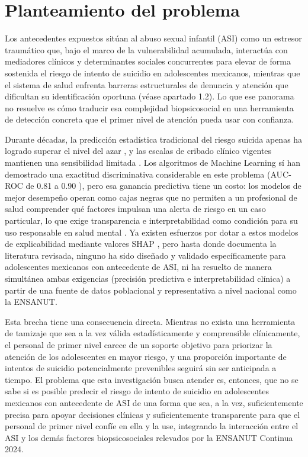 \section{Planteamiento del problema}

Los antecedentes expuestos sitúan al abuso sexual infantil (ASI) como un estresor traumático que, bajo el marco de la vulnerabilidad acumulada, interactúa con mediadores clínicos y determinantes sociales concurrentes para elevar de forma sostenida el riesgo de intento de suicidio en adolescentes mexicanos, mientras que el sistema de salud enfrenta barreras estructurales de denuncia y atención que dificultan su identificación oportuna (véase apartado 1.2). Lo que ese panorama no resuelve es cómo traducir esa complejidad biopsicosocial en una herramienta de detección concreta que el primer nivel de atención pueda usar con confianza.

Durante décadas, la predicción estadística tradicional del riesgo suicida apenas ha logrado superar el nivel del azar \cite{linthicumMachineLearningSuicide2019}, y las escalas de cribado clínico vigentes mantienen una sensibilidad limitada \cite{tangAnalysisEvaluationExplainable2024}. Los algoritmos de Machine Learning sí han demostrado una exactitud discriminativa considerable en este problema (AUC-ROC de 0.81 a 0.90 \cite{suMachineLearningSuicide2020,walshPredictingSuicideAttempts2018}), pero esa ganancia predictiva tiene un costo: los modelos de mejor desempeño operan como cajas negras que no permiten a un profesional de salud comprender qué factores impulsan una alerta de riesgo en un caso particular, lo que exige transparencia e interpretabilidad como condición para su uso responsable en salud mental \cite{joyceExplainableArtificialIntelligence2023,linthicumMachineLearningSuicide2019}. Ya existen esfuerzos por dotar a estos modelos de explicabilidad mediante valores SHAP \cite{nordinExplainableMachineLearning2022}, pero hasta donde documenta la literatura revisada, ninguno ha sido diseñado y validado específicamente para adolescentes mexicanos con antecedente de ASI, ni ha resuelto de manera simultánea ambas exigencias (precisión predictiva e interpretabilidad clínica) a partir de una fuente de datos poblacional y representativa a nivel nacional como la ENSANUT.

Esta brecha tiene una consecuencia directa. Mientras no exista una herramienta de tamizaje que sea a la vez válida estadísticamente y comprensible clínicamente, el personal de primer nivel carece de un soporte objetivo para priorizar la atención de los adolescentes en mayor riesgo, y una proporción importante de intentos de suicidio potencialmente prevenibles seguirá sin ser anticipada a tiempo. El problema que esta investigación busca atender es, entonces, que no se sabe si es posible predecir el riesgo de intento de suicidio en adolescentes mexicanos con antecedente de ASI de una forma que sea, a la vez, suficientemente precisa para apoyar decisiones clínicas y suficientemente transparente para que el personal de primer nivel confíe en ella y la use, integrando la interacción entre el ASI y los demás factores biopsicosociales relevados por la ENSANUT Continua 2024.

